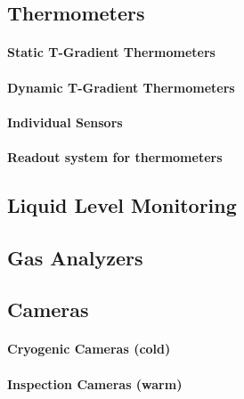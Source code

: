 \subsection{Thermometers}
\label{sec:fddp-slow-cryo-therm}


\paragraph{Static T-Gradient Thermometers}

\paragraph{Dynamic T-Gradient Thermometers}

\paragraph{Individual Sensors}

\paragraph{Readout system for thermometers}


\subsection{Liquid Level Monitoring}
\label{sec:fddp-slow-cryo-liq-lev}

\subsection{Gas Analyzers}
\label{sec:fddp-slow-cryo-gas-anlyz}

\subsection{Cameras}
\label{sec:fddp-slow-cryo-cameras}

\paragraph{Cryogenic Cameras (cold)}

\paragraph{Inspection Cameras (warm)}


